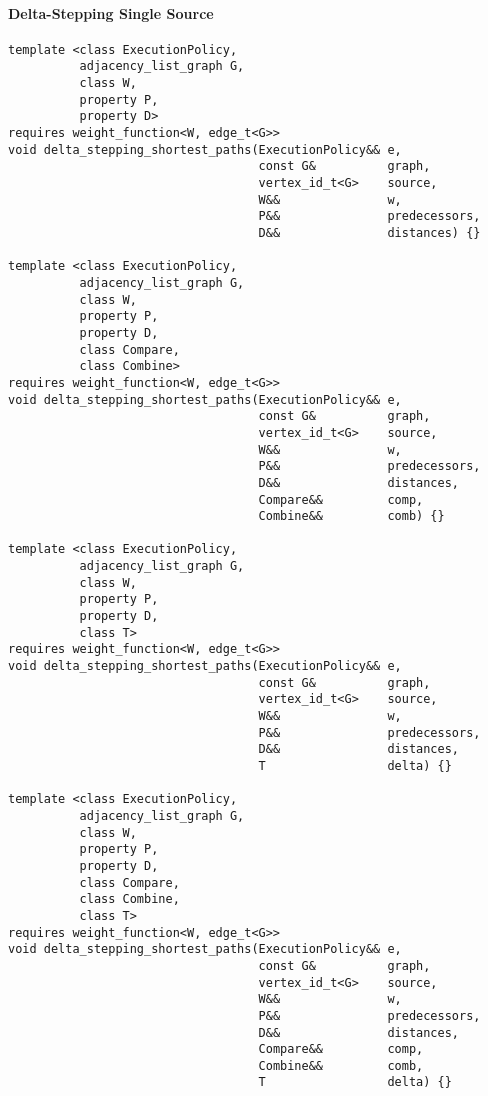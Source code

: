 \paragraph{Delta-Stepping Single Source}
\begin{lstlisting}
template <class ExecutionPolicy,
          adjacency_list_graph G,
          class W,
          property P,
          property D>
requires weight_function<W, edge_t<G>>
void delta_stepping_shortest_paths(ExecutionPolicy&& e,
                                   const G&          graph,
                                   vertex_id_t<G>    source,
                                   W&&               w,
                                   P&&               predecessors,
                                   D&&               distances) {}

template <class ExecutionPolicy,
          adjacency_list_graph G,
          class W,
          property P,
          property D,
          class Compare,
          class Combine>
requires weight_function<W, edge_t<G>>
void delta_stepping_shortest_paths(ExecutionPolicy&& e,
                                   const G&          graph,
                                   vertex_id_t<G>    source,
                                   W&&               w,
                                   P&&               predecessors,
                                   D&&               distances,
                                   Compare&&         comp,
                                   Combine&&         comb) {}

template <class ExecutionPolicy,
          adjacency_list_graph G,
          class W,
          property P,
          property D,
          class T>
requires weight_function<W, edge_t<G>>
void delta_stepping_shortest_paths(ExecutionPolicy&& e,
                                   const G&          graph,
                                   vertex_id_t<G>    source,
                                   W&&               w,
                                   P&&               predecessors,
                                   D&&               distances,
                                   T                 delta) {}

template <class ExecutionPolicy,
          adjacency_list_graph G,
          class W,
          property P,
          property D,
          class Compare,
          class Combine,
          class T>
requires weight_function<W, edge_t<G>>
void delta_stepping_shortest_paths(ExecutionPolicy&& e,
                                   const G&          graph,
                                   vertex_id_t<G>    source,
                                   W&&               w,
                                   P&&               predecessors,
                                   D&&               distances,
                                   Compare&&         comp,
                                   Combine&&         comb,
                                   T                 delta) {}

\end{lstlisting}

